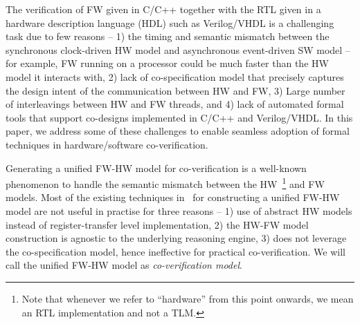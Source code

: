 \documentclass[sigconf]{acmart}
\begin{document}
The verification of FW given in C/C++ together with the RTL given in a hardware
description language (HDL) such as Verilog/VHDL is a challenging task due to 
few reasons -- 1) the timing and semantic mismatch between the synchronous
clock-driven HW model and asynchronous event-driven SW model -- for example,
FW running on a processor could be much faster than the HW
model it interacts with, 2) lack of co-specification model that precisely
captures the design intent of the communication between HW and FW, 3) Large
number of interleavings between HW and FW threads, and 4) lack 
of automated formal tools that support co-designs implemented in C/C++ and 
Verilog/VHDL.   In this paper, we address some of these challenges to enable
seamless adoption of formal techniques in hardware/software co-verification.   


Generating a unified FW-HW model for co-verification is a 
well-known phenomenon to handle the semantic mismatch between the 
HW~\footnote{Note that whenever we refer to ``hardware'' 
from this point onwards, we mean an RTL implementation 
and not a TLM.}  and FW models.  Most of the existing techniques 
in~\cite{fmsd02,emsoft07,fase10} for constructing a unified FW-HW model are not 
useful in practise for three reasons -- 1) use of abstract HW models 
instead of register-transfer level implementation, 2) the HW-FW model
construction is agnostic to the underlying reasoning engine, 3) does not
leverage the co-specification model, hence ineffective for practical
co-verification.  We will call the unified FW-HW model as \emph{co-verification model}. 
\end{document}
